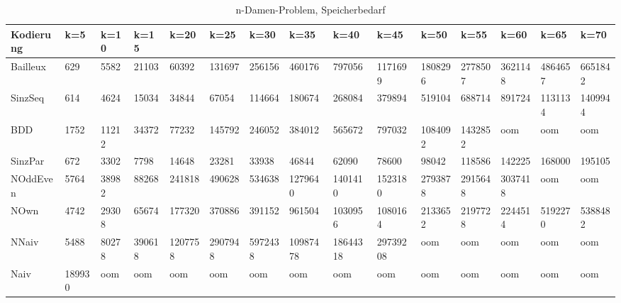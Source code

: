 \documentclass[a4,abstract=on]{scrartcl}
\begin{document}
\begin{landscape}
 \begin{table}[h!]
    \small
    \setlength{\tabcolsep}{0.11cm}
     \centering
     \begin{tabular}[width=\textwidth]{|l||l|l|l|l|l|l|l|l|l|l|l|l|l|l|}
	\hline
       \textbf{Kodierung}  & \textbf{k=5} & \textbf{k=10} & \textbf{k=15} &\textbf{k=20} &\textbf{k=25} &\textbf{k=30} &\textbf{k=35} &\textbf{k=40} &\textbf{k=45} &\textbf{k=50} &\textbf{k=55} &\textbf{k=60} &\textbf{k=65} &\textbf{k=70}\\
	\hline
	\hline
	Bailleux & 629 & 5582 & 21103 & 60392 & 131697 & 256156 & 460176 & 797056 & 1171699 & 1808296 & 2778507 & 3621148 & 4864657 & 6651842\\
\hline
	SinzSeq & 614 & 4624 & 15034 & 34844 & 67054 & 114664 & 180674 & 268084 & 379894 & 519104 & 688714 & 891724 & 1131134 & 1409944 \\
\hline
	BDD & 1752 & 11212 & 34372 & 77232 & 145792 & 246052 & 384012 &565672 &797032 &1084092 & 1432852 & oom & oom & oom\\
\hline
	SinzPar & 672 & 3302 & 7798 & 14648 & 23281 & 33938 & 46844 & 62090 & 78600 & 98042 & 118586 & 142225 & 168000 & 195105 \\
\hline
	NOddEven & 5764 & 38982 & 88268 & 241818 & 490628 & 534638 & 1279640 & 1401410 & 1523180 & 2793878 & 2915648 & 3037418 & oom & oom\\
\hline
	NOwn & 4742 & 29308 & 65674 & 177320 & 370886 & 391152 & 961504 & 1030956 & 1080164 & 2133652 & 2197728 & 2244514 & 5192270 & 5388482\\
 \hline
	NNaiv & 5488 & 80278 & 390618 & 1207758 & 2907948 & 5972438 & 10987478 & 18644318 & 29739208 & oom & oom & oom & oom & oom\\
\hline
	Naiv & 189930 & oom &  oom &  oom &  oom &  oom &  oom &  oom &  oom &  oom &  oom &  oom &  oom &  oom\\
\hline
       
     \end{tabular}

     \caption{n-Damen-Problem, Speicherbedarf}
     \label{tbl:beispieltabelle}


\end{table}
\end{landscape}
\end{document}
